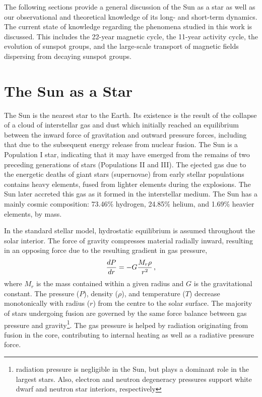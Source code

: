 The following sections provide a general discussion of the Sun as a star as well as our observational and theoretical knowledge of its long- and short-term dynamics. The current state of knowledge regarding the phenomena studied in this work is discussed. This includes the 22-year magnetic cycle, the 11-year activity cycle, the evolution of sunspot groups, and the large-scale transport of magnetic fields dispersing from decaying sunspot groups.


\section{The Sun as a Star}

The Sun is the nearest star to the Earth. Its existence is the result of the collapse of a cloud of interstellar gas and dust which initially reached an equilibrium between the inward force of gravitation and outward pressure forces, including that due to the subsequent energy release from nuclear fusion. The Sun is a Population I star, indicating that it may have emerged from the remains of two preceding generations of stars (Populations II and III). The ejected gas due to the energetic deaths of giant stars (supernovae) from early stellar populations contains heavy elements, fused from lighter elements during the explosions. The Sun later accreted this gas as it formed in the interstellar medium. The Sun has a mainly cosmic composition: 73.46\% hydrogen, 24.85\% helium, and 1.69\% heavier elements, by mass. 

In the standard stellar model, hydrostatic equilibrium is assumed throughout the solar interior. The force of gravity compresses material radially inward, resulting in an opposing force due to the resulting gradient in gas pressure,
\begin{equation}\label{eqn:hydroeq}
\frac{dP}{dr} = -G\frac{M_r\rho}{r^2} \mbox{\,,}
\end{equation}
where $M_r$ is the mass contained within a given radius and $G$ is the gravitational constant. The pressure ($P$), density ($\rho$), and temperature ($T$) decrease monotonically with radius ($r$) from the centre to the solar surface. The majority of stars undergoing fusion are governed by the same force balance between gas pressure and gravity\footnote{radiation pressure is negligible in the Sun, but plays a dominant role in the largest stars. Also, electron and neutron degeneracy  pressures support white dwarf and neutron star interiors, respectively}. The gas pressure is helped by radiation originating from fusion in the core, contributing to internal heating as well as a radiative pressure force.

